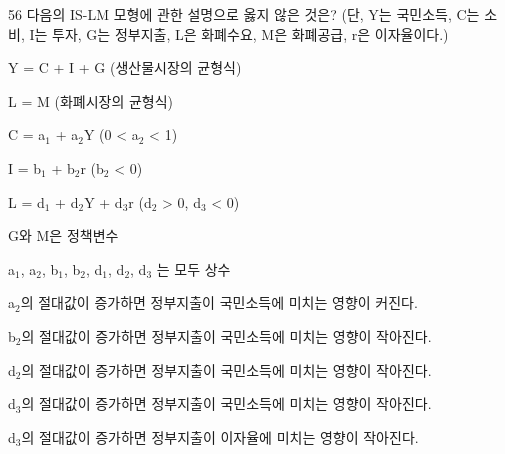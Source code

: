 \begin{question}{56}
다음의 IS-LM 모형에 관한 설명으로 옳지 않은 것은? (단, Y는 국민소득, C는 소비, I는 투자, G는 정부지출, L은 화폐수요, M은 화폐공급, r은 이자율이다.)
\begin{framedtext}
Y = C + I + G (생산물시장의 균형식) \par
L = M (화폐시장의 균형식) \par
C = a$_{1}$ + a$_{2}$Y (0 < a$_{2}$ < 1) \par
I = b$_{1}$ + b$_{2}$r (b$_{2}$ < 0) \par
L = d$_{1}$ + d$_{2}$Y + d$_{3}$r (d$_{2}$ > 0, d$_{3}$ < 0) \par
G와 M은 정책변수 \par
a$_{1}$, a$_{2}$, b$_{1}$, b$_{2}$, d$_{1}$, d$_{2}$, d$_{3}$ 는 모두 상수 \par
\end{framedtext}
\begin{choices}
  \item a$_{2}$의 절대값이 증가하면 정부지출이 국민소득에 미치는 영향이 커진다.
  \item b$_{2}$의 절대값이 증가하면 정부지출이 국민소득에 미치는 영향이 작아진다.
  \item d$_{2}$의 절대값이 증가하면 정부지출이 국민소득에 미치는 영향이 작아진다.
  \item d$_{3}$의 절대값이 증가하면 정부지출이 국민소득에 미치는 영향이 작아진다.
  \item d$_{3}$의 절대값이 증가하면 정부지출이 이자율에 미치는 영향이 작아진다.
\end{choices}
\end{question}
